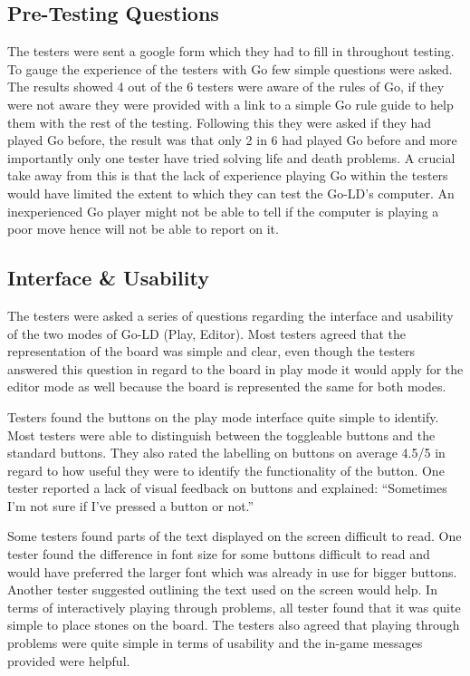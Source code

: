 \documentclass{l4proj}
\begin{document}
\subsection{Pre-Testing Questions}
The testers were sent a google form which they had to fill in throughout testing. To gauge the experience of the testers with Go few simple questions were asked. The results showed 4 out of the 6 testers were aware of the rules of Go, if they were not aware they were provided with a link to a simple Go rule guide to help them with the rest of the testing. Following this they were asked if they had played Go before, the result was that only 2 in 6 had played Go before and more importantly only one tester have tried solving life and death problems. A crucial take away from this is that the lack of experience playing Go within the testers would have limited the extent to which they can test the Go-LD’s computer. An inexperienced Go player might not be able to tell if the computer is playing a poor move hence will not be able to report on it.

\subsection{Interface \& Usability}
The testers were asked a series of questions regarding the interface and usability of the two modes of Go-LD (Play, Editor). Most testers agreed that the representation of the board was simple and clear, even though the testers answered this question in regard to the board in play mode it would apply for the editor mode as well because the board is represented the same for both modes.

Testers found the buttons on the play mode interface quite simple to identify. Most testers were able to distinguish between the toggleable buttons and the standard buttons. They also rated the labelling on buttons on average 4.5/5 in regard to how useful they were to identify the functionality of the button. One tester reported a lack of visual feedback on buttons and explained: “Sometimes I'm not sure if I've pressed a button or not.”

Some testers found parts of the text displayed on the screen difficult to read. One tester found the difference in font size for some buttons difficult to read and would have preferred the larger font which was already in use for bigger buttons. Another tester suggested outlining the text used on the screen would help. In terms of interactively playing through problems, all tester found that it was quite simple to place stones on the board. The testers also agreed that playing through problems were quite simple in terms of usability and the in-game messages provided were helpful.
\end{document}
